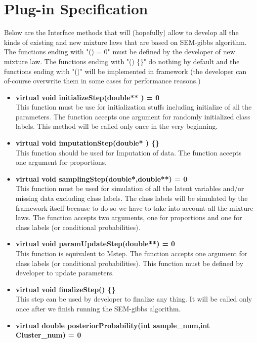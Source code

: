 \documentclass[a4paper,11pt]{article}
\begin{document}
\section{Plug-in Specification}

Below are the Interface methods that will (hopefully) allow to develop all the
kinds of existing and new mixture laws that are based on SEM-gibbs algorithm.
The functions ending with "() = 0" must be defined by the developer of new mixture
law. The functions ending with "() \{\}" do nothing by default and the functions
ending with "()" will be implemented in framework (the developer can of-course
overwrite them in some cases for performance reasons.)
\begin{itemize}
\item {\bf virtual void initializeStep(double** ) = 0} \\
This function must be use for initialization stuffs including initialize of all
the parameters. The function accepts one argument for randomly initialized class
labels. This method will be called only once in the very beginning.
\item {\bf virtual void imputationStep(double* ) \{\}}\\
This function should be used for Imputation of data. The function accepts one argument for proportions.
\item {\bf virtual void samplingStep(double*,double**) = 0} \\
This function must be used for simulation of all the latent variables and/or missing data
excluding class labels. The class labels will be simulated by the framework itself because to do so
we have to take into account all the mixture laws. The function accepts two arguments, one for
proportions and one for class labels (or conditional probabilities).
\item {\bf virtual void paramUpdateStep(double**) = 0}\\
This function is equivalent to Mstep. The function accepts one argument for class labels
(or conditional probabilities). This function must be defined by developer to update parameters.
\item {\bf virtual void finalizeStep() \{\}}\\
This step can be used by developer to finalize any thing. It will be called only once after we
finish running the SEM-gibbs algorithm.
\item {\bf virtual double posteriorProbability(int sample\_num,int Cluster\_num) = 0}\\

\end{itemize}
\end{document}
